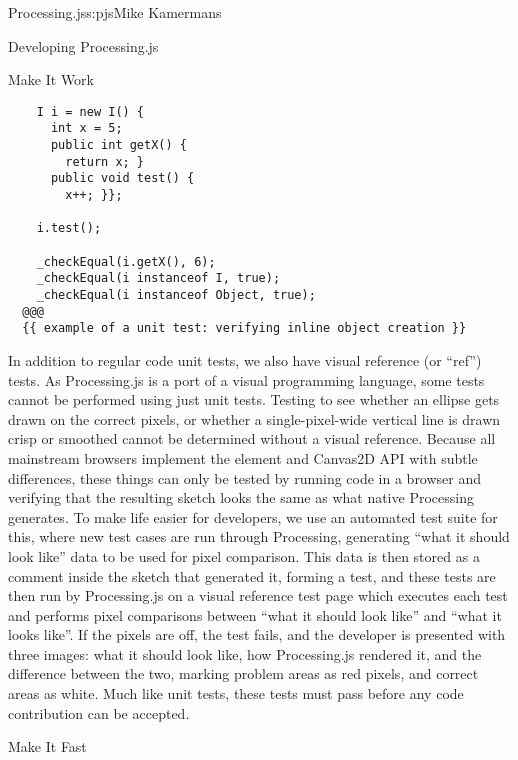 \begin{aosachapter}{Processing.js}{s:pjs}{Mike Kamermans}
\begin{aosasect1}{Developing Processing.js}
\begin{aosasect2}{Make It Work}
\begin{verbatim}
    I i = new I() {
      int x = 5;
      public int getX() {
        return x; }
      public void test() {
        x++; }};

    i.test();

    _checkEqual(i.getX(), 6);
    _checkEqual(i instanceof I, true);
    _checkEqual(i instanceof Object, true);
  @@@
  {{ example of a unit test: verifying inline object creation }}
\end{verbatim}

In addition to regular code unit tests, we also have visual reference
(or ``ref'') tests. As Processing.js is a port of a visual programming
language, some tests cannot be performed using just unit
tests. Testing to see whether an ellipse gets drawn on the correct
pixels, or whether a single-pixel-wide vertical line is drawn crisp or
smoothed cannot be determined without a visual reference. Because all
mainstream browsers implement the
 element and Canvas2D API with
subtle differences, these things can only be tested by running code in
a browser and verifying that the resulting sketch looks the same as
what native Processing generates. To make life easier for developers,
we use an automated test suite for this, where new test cases are run
through Processing, generating ``what it should look like'' data to be
used for pixel comparison. This data is then stored as a comment
inside the sketch that generated it, forming a test, and these tests
are then run by Processing.js on a visual reference test page which
executes each test and performs pixel comparisons between ``what it
should look like'' and ``what it looks like''. If the pixels are off, the
test fails, and the developer is presented with three images:
what it should look like, how Processing.js
rendered it, and the difference between the two, marking
problem areas as red pixels, and correct areas as white. Much like
unit tests, these tests must pass before any code contribution can be
accepted.

\end{aosasect2}

\begin{aosasect2}{Make It Fast}


\end{aosasect2}
\end{aosasect1}
\end{aosachapter}
